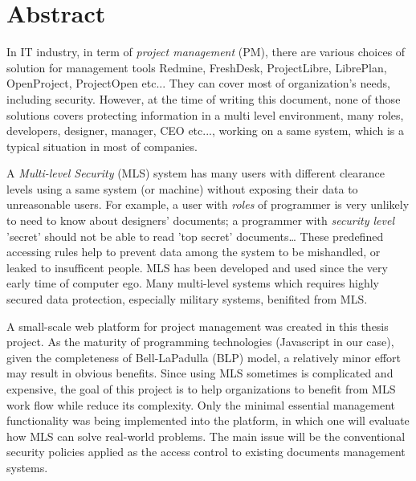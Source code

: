 

\begingroup
\let\clearpage\relax
\let\cleardoublepage\relax
\let\cleardoublepage\relax

\chapter*{Abstract} %

In IT industry, in term of \emph{project management} (PM), there are various choices of solution for management tools \eg Redmine, FreshDesk, ProjectLibre, LibrePlan, OpenProject, ProjectOpen etc...
They can cover most of organization's needs, including security.
However, at the time of writing this document, none of those solutions covers protecting information in a multi level environment, \ie many roles, \eg developers, designer, manager, CEO etc..., working on a same system, which is a typical situation in most of companies. 

A \emph{Multi-level Security} (MLS) system has many users with different clearance levels using a same system (or machine) without exposing their data to unreasonable users.
For example, a user with \emph{roles} of programmer is very unlikely to need to know about designers' documents;
a programmer with \emph{security level} 'secret' should not be able to read 'top secret' documents\dots
These predefined accessing rules help to prevent data among the system to be mishandled, or leaked to insufficent people.
MLS has been developed and used since the very early time of computer ego.
Many multi-level systems which requires highly secured data protection, especially military systems, benifited from MLS.

A small-scale web platform for project management was created in this thesis project.
As the maturity of programming technologies (\eg Javascript in our case), given the completeness of Bell-LaPadulla (BLP) model, a relatively minor effort may result in obvious benefits.
Since using MLS sometimes is complicated and expensive, the goal of this project is to help organizations to benefit from MLS work flow while reduce its complexity.
Only the minimal essential management functionality was being implemented into the platform, in which one will evaluate how MLS can solve real-world problems.
The main issue will be the conventional security policies applied as the access control to existing documents management systems.

